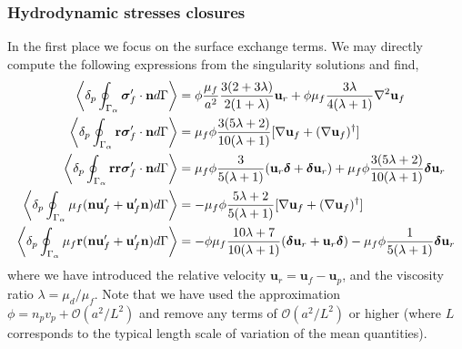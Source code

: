 \subsubsection{Hydrodynamic stresses closures}
In the first place we focus on the surface exchange terms. 
We may directly compute the following expressions from the singularity solutions and find, 
\begin{align}
    \pSavg{\bm\sigma_f'\cdot \textbf{n}} &
    =
    \phi
    \frac{\mu_f}{a^2}
    \frac{3(2+3\lambda)}{2(1+\lambda)}\textbf{u}_r
    + \phi\mu_f  \frac{3\lambda}{4(\lambda +1)} \grad^2 \textbf{u}_f
    \label{eq:drag_forces}
    \\
    \pSavg{\textbf{r}\bm\sigma_f'\cdot \textbf{n}} &
    = \mu_f \phi 
    \frac{3(5\lambda +2)}{10(\lambda +1)}[\grad \textbf{u}_f+ (\grad \textbf{u}_f)^\dagger]
    \\
    \pSavg{\textbf{rr}\bm\sigma_f'\cdot \textbf{n}} &
    =
    \mu_f \phi \frac{3}{5(\lambda +1)} (\textbf{u}_r \bm\delta + \bm\delta \textbf{u}_r)
    + \mu_f \phi \frac{3(5\lambda +2)}{10(\lambda+1)}\bm\delta \textbf{u}_r\\
    \pSavg{\mu_f (\textbf{n} \textbf{u}_f' + \textbf{u}_f' \textbf{n})}
    &=
    - \mu_f \phi \frac{5\lambda +2}{5(\lambda+1)}
    [\grad \textbf{u}_f+ (\grad \textbf{u}_f)^\dagger]
    \\
    \pSavg{\mu_f \textbf{r}(\textbf{n} \textbf{u}_f' + \textbf{u}_f' \textbf{n})}
    &=
    -\phi\mu_f \frac{10\lambda +7}{10(\lambda+1)}
    (\bm\delta \textbf{u}_r + \textbf{u}_r \bm\delta)
    -\mu_f \phi  \frac{1}{5(\lambda+1)}\bm\delta \textbf{u}_r
    \label{eq:secondUN}
\end{align}
where we have introduced the relative velocity $\textbf{u}_r = \textbf{u}_f - \textbf{u}_p$, and the viscosity ratio $\lambda = \mu_d/\mu_f$. 
Note that we have used the approximation $\phi=n_pv_p + \mathcal{O}(a^2/L^2)$ and remove any terms of $\mathcal{O}(a^2/L^2)$ or higher (where $L$ corresponds to the typical length  scale of variation of the mean quantities). 



